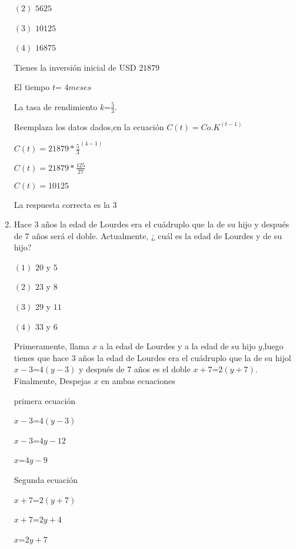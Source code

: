 \documentclass[11pt, a4paper]{article} %
\theoremstyle{dotlessP}
\theoremstyle{dotlessS}
\begin{document}
\begin{enumerate}[label=\color{dg}\theenumi.]
{        \((2)\) \(5625\)
        
        \((3)\)  \(10125\) 
        
        \((4)\) \(16875\) }
       
       
       Tienes la inversión inicial de USD \(21879\)
       
       El tiempo \(t\)= \(4 meses \)
       
       La tasa de rendimiento \(k\)=\(\frac{5}{3}\).
       
     Reemplaza los datos dados,en la ecuación  \(C(t)= Co.K^{(t-1)}\)
     
     \(C(t)=21879*\frac{5}{3}^{ (4-1)}\)
     
     \(C(t)=21879*\frac{125}{27}\)
     
      \(C(t)=10125\)
    
       {\color{dh}La respuesta correcta es la 3}
         

        \item{\color{db}
        Hace \(3\) años la edad de Lourdes era el cuádruplo que la de su hijo y después de \(7\) años será el doble. Actualmente, ¿ cuál es la edad de Lourdes y de su hijo? }
        
         {\color{dh} \((1)\)  \(20\) y \(5\)
        
        \((2)\) \(23\) y \(8\)
        
        \((3)\)  \(29\) y \(11\) 
        
        \((4)\) \(33\) y \(6\) }
        
         Primeramente, llama \(x\) a la edad de Lourdes y a la edad de su hijo \(y\),luego tienes que hace \(3\) años la edad de Lourdes era el cuádruplo que la de su hijol \(x-3\)=\(4(y-3)\) y después de \(7\) años es el doble \(x+7\)=\(2(y+7)\). Finalmente, Despejas \(x\) en ambas ecuaciones 
         
         primera ecuación
        
        \(x-3\)=\(4(y-3)\)
         
         \(x-3\)=\(4y-12\)
         
         \(x\)=\(4y-9\)
         
         Segunda ecuación
         
         \(x+7\)=\(2(y+7)\)
         
         \(x+7\)=\(2y+4\)
         
         \(x\)=\(2y+7\)
         

\end{enumerate}
\end{document}
